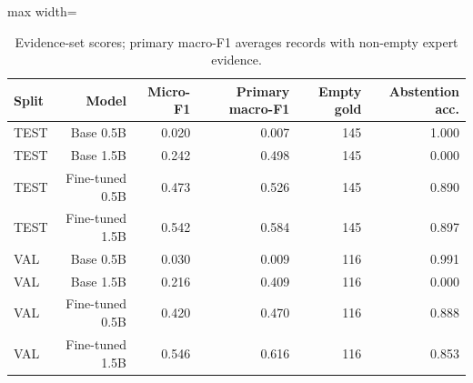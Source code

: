 \begin{table}[t]
\centering
\caption{Evidence-set scores; primary macro-F1 averages records with non-empty expert evidence.}
\label{tab:evidence-results}
\begin{adjustbox}{max width=\columnwidth}
\begin{tabular}{lrrrrr}
\toprule
Split & Model & Micro-F1 & Primary macro-F1 & Empty gold & Abstention acc. \\
\midrule
TEST & Base 0.5B & 0.020 & 0.007 & 145 & 1.000 \\
TEST & Base 1.5B & 0.242 & 0.498 & 145 & 0.000 \\
TEST & Fine-tuned 0.5B & 0.473 & 0.526 & 145 & 0.890 \\
TEST & Fine-tuned 1.5B & 0.542 & 0.584 & 145 & 0.897 \\
VAL & Base 0.5B & 0.030 & 0.009 & 116 & 0.991 \\
VAL & Base 1.5B & 0.216 & 0.409 & 116 & 0.000 \\
VAL & Fine-tuned 0.5B & 0.420 & 0.470 & 116 & 0.888 \\
VAL & Fine-tuned 1.5B & 0.546 & 0.616 & 116 & 0.853 \\
\bottomrule
\end{tabular}
\end{adjustbox}
\end{table}
